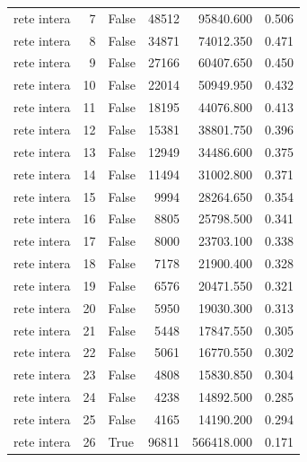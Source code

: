 \begin{table}
\begin{tabular}{lrlrrr}
rete intera &    7 &             False &      48512 &     95840.600 &     0.506 \\
rete intera &    8 &             False &      34871 &     74012.350 &     0.471 \\
rete intera &    9 &             False &      27166 &     60407.650 &     0.450 \\
rete intera &   10 &             False &      22014 &     50949.950 &     0.432 \\
rete intera &   11 &             False &      18195 &     44076.800 &     0.413 \\
rete intera &   12 &             False &      15381 &     38801.750 &     0.396 \\
rete intera &   13 &             False &      12949 &     34486.600 &     0.375 \\
rete intera &   14 &             False &      11494 &     31002.800 &     0.371 \\
rete intera &   15 &             False &       9994 &     28264.650 &     0.354 \\
rete intera &   16 &             False &       8805 &     25798.500 &     0.341 \\
rete intera &   17 &             False &       8000 &     23703.100 &     0.338 \\
rete intera &   18 &             False &       7178 &     21900.400 &     0.328 \\
rete intera &   19 &             False &       6576 &     20471.550 &     0.321 \\
rete intera &   20 &             False &       5950 &     19030.300 &     0.313 \\
rete intera &   21 &             False &       5448 &     17847.550 &     0.305 \\
rete intera &   22 &             False &       5061 &     16770.550 &     0.302 \\
rete intera &   23 &             False &       4808 &     15830.850 &     0.304 \\
rete intera &   24 &             False &       4238 &     14892.500 &     0.285 \\
rete intera &   25 &             False &       4165 &     14190.200 &     0.294 \\
rete intera &   26 &              True &      96811 &    566418.000 &     0.171 \\
\bottomrule
\end{tabular}
\end{table}
